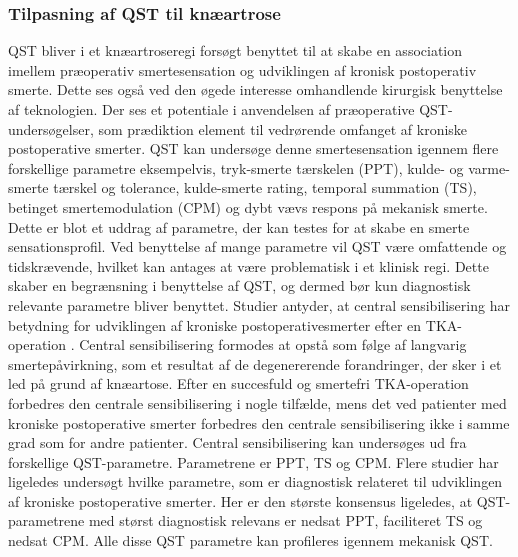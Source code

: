 \subsubsection{Tilpasning af QST til knæartrose}
QST bliver i et knæartroseregi forsøgt benyttet til at skabe en association imellem præoperativ smertesensation og udviklingen af kronisk postoperativ smerte. Dette ses også ved den øgede interesse omhandlende kirurgisk benyttelse af teknologien. Der ses et potentiale i anvendelsen af præoperative QST-undersøgelser, som prædiktion element til vedrørende omfanget af kroniske postoperative smerter. \citep{Wylde2013} \citep{Lunn2013} QST kan undersøge denne smertesensation igennem flere forskellige parametre eksempelvis, tryk-smerte tærskelen (PPT), kulde- og varme-smerte tærskel og tolerance, kulde-smerte rating, temporal summation (TS), betinget smertemodulation (CPM) og dybt vævs respons på mekanisk smerte. \citep{Cornelius2015} Dette er blot et uddrag af parametre, der kan testes for at skabe en smerte sensationsprofil. Ved benyttelse af mange parametre vil QST være omfattende og tidskrævende, hvilket kan antages at være problematisk i et klinisk regi. Dette skaber en begrænsning i benyttelse af QST, og dermed bør kun diagnostisk relevante parametre bliver benyttet. \citep{Lunn2013} Studier antyder, at central sensibilisering har betydning for udviklingen af kroniske postoperativesmerter efter en TKA-operation \citep{Suokas2012}. Central sensibilisering formodes at opstå som følge af langvarig smertepåvirkning, som et resultat af de degenererende forandringer, der sker i et led på grund af knæartose. \citep{Arendt-Nielsen2015b} Efter en succesfuld og smertefri TKA-operation forbedres den centrale sensibilisering i nogle tilfælde, mens det ved patienter med kroniske postoperative smerter forbedres den centrale sensibilisering ikke i samme grad som for andre patienter. \citep{Arendt-Nielsen2015b} Central sensibilisering kan undersøges ud fra forskellige QST-parametre. Parametrene er PPT, TS og CPM. \citep{Arendt-Nielsen2015b} Flere studier har ligeledes undersøgt hvilke parametre, som er diagnostisk relateret til udviklingen af kroniske postoperative smerter. Her er den største konsensus ligeledes, at QST-parametrene med størst diagnostisk relevans er nedsat PPT, faciliteret TS og nedsat CPM. Alle disse QST parametre kan profileres igennem mekanisk QST. \citep{Petersen2015} \citep{Petersen2016} \citep{Wylde2015} \\
